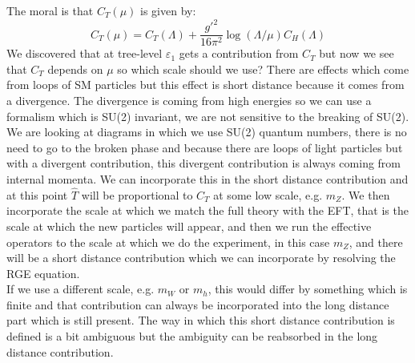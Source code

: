 \documentclass[../main.tex]{subfiles}
\begin{document}
The moral is that $C_T(\mu)$ is given by:
\[
C_T(\mu)=C_T(\Lambda)+\frac{g'^2}{16\pi^2}\log(\Lambda/\mu)C_H(\Lambda)
\]
We discovered that at tree-level $\varepsilon_1$ gets a contribution from $C_T$ but now we see that $C_T$ depends on $\mu$ so which scale should we use? There are effects which come from loops of SM particles but this effect is short distance because it comes from a divergence. The divergence is coming from high energies so we can use a formalism which is SU(2) invariant, we are not sensitive to the breaking of SU(2). We are looking at diagrams in which we use SU(2) quantum numbers, there is no need to go to the broken phase and because there are loops of light particles but with a divergent contribution, this divergent contribution is always coming from internal momenta. We can incorporate this in the short distance contribution and at this point $\hat{T}$ will be proportional to $C_T$ at some low scale, e.g. $m_Z$. We then incorporate the scale at which we match the full theory with the EFT, that is the scale at which the new particles will appear, and then we run the effective operators to the scale at which we do the experiment, in this case $m_Z$, and there will be a short distance contribution which we can incorporate by resolving the RGE equation.\\
If we use a different scale, e.g. $m_W$ or $m_h$, this would differ by something which is finite and that contribution can always be incorporated into the long distance part which is still present. The way in which this short distance contribution is defined is a bit ambiguous but the ambiguity can be reabsorbed in the long distance contribution.  
\end{document}
